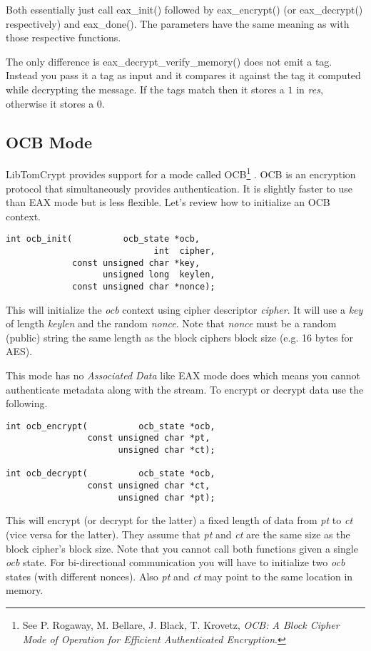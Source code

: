 \documentclass[synpaper]{book}
\begin{document}
Both essentially just call eax\_init() followed by eax\_encrypt() (or eax\_decrypt() respectively) and eax\_done().  The parameters
have the same meaning as with those respective functions.  

The only difference is eax\_decrypt\_verify\_memory() does not emit a tag.  Instead you pass it a tag as input and it compares it against
the tag it computed while decrypting the message.  If the tags match then it stores a $1$ in \textit{res}, otherwise it stores a $0$.

\subsection{OCB Mode}
LibTomCrypt provides support for a mode called OCB\footnote{See 
P. Rogaway, M. Bellare, J. Black, T. Krovetz, \textit{OCB: A Block Cipher Mode of Operation for Efficient Authenticated Encryption}.}
.  OCB is an encryption protocol that simultaneously provides authentication.  It is slightly faster to use than EAX mode
but is less flexible.  Let's review how to initialize an OCB context.

\begin{verbatim}
int ocb_init(          ocb_state *ocb, 
                             int  cipher, 
             const unsigned char *key, 
                   unsigned long  keylen, 
             const unsigned char *nonce);
\end{verbatim}

This will initialize the \textit{ocb} context using cipher descriptor \textit{cipher}.  It will use a \textit{key} of length \textit{keylen}
and the random \textit{nonce}.  Note that \textit{nonce} must be a random (public) string the same length as the block ciphers
block size (e.g. 16 bytes for AES).

This mode has no \textit{Associated Data} like EAX mode does which means you cannot authenticate metadata along with the stream.
To encrypt or decrypt data use the following.

 
\begin{verbatim}
int ocb_encrypt(          ocb_state *ocb, 
                const unsigned char *pt, 
                      unsigned char *ct);

int ocb_decrypt(          ocb_state *ocb, 
                const unsigned char *ct, 
                      unsigned char *pt);
\end{verbatim}

This will encrypt (or decrypt for the latter) a fixed length of data from \textit{pt} to \textit{ct} (vice versa for the latter).  
They assume that \textit{pt} and \textit{ct} are the same size as the block cipher's block size.  Note that you cannot call 
both functions given a single \textit{ocb} state.  For bi-directional communication you will have to initialize two \textit{ocb}
states (with different nonces).  Also \textit{pt} and \textit{ct} may point to the same location in memory.
\end{document}
